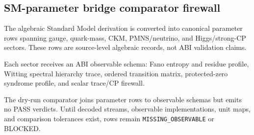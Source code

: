 \subsection{SM-parameter bridge comparator firewall}
\label{sec:bt1621-bt1623-sm-bridge-comparator}

The algebraic Standard Model derivation is converted into canonical parameter rows spanning gauge, quark-mass, CKM, PMNS/neutrino, and Higgs/strong-CP sectors.  These rows are source-level algebraic records, not ABI validation claims.

Each sector receives an ABI observable schema: Fano entropy and residue profile, Witting spectral hierarchy trace, ordered transition matrix, protected-zero syndrome profile, and scalar trace/CP firewall.

The dry-run comparator joins parameter rows to observable schemas but emits no PASS verdicts.  Until decoded streams, observable implementations, unit maps, and comparison tolerances exist, rows remain \texttt{MISSING\_OBSERVABLE} or BLOCKED.
